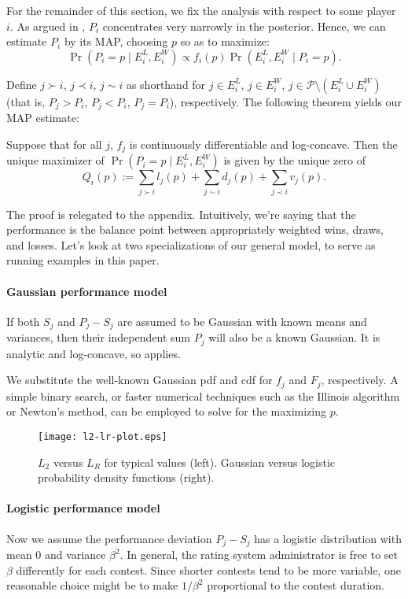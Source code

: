 For the remainder of this section, we fix the analysis with respect to some player $i$. As argued in , $P_i$ concentrates very narrowly in the posterior. Hence, we can estimate $P_i$ by its MAP, choosing $p$ so as to maximize:
\[\Pr(P_i=p\mid E^L_i,E^W_i) \propto f_i(p) \Pr(E^L_i,E^W_i\mid P_i=p).\]

Define $j\succ i$, $j\prec i$, $j\sim i$ as shorthand for $j\in E^L_i$, $j\in E^W_i$, $j\in \mathcal P\setminus (E^L_i\cup E^W_i)$ (that is, $P_j>P_i$, $P_j<P_i$, $P_j=P_i$), respectively. The following theorem yields our MAP estimate:
\begin{theorem}
\label{thm:uniq-max}
Suppose that for all $j$, $f_j$ is continuously differentiable and log-concave. Then the unique maximizer of $\Pr(P_i=p\mid E^L_i,E^W_i)$ is given by the unique zero of
\[Q_i(p) := \sum_{j \succ i} l_j(p) + \sum_{j \sim i} d_j(p) + \sum_{j \prec i} v_j(p).\]
\end{theorem}
The proof is relegated to the appendix. Intuitively, we're saying that the performance is the balance point between appropriately weighted wins, draws, and losses. Let's look at two specializations of our general model, to serve as running examples in this paper.

\paragraph{Gaussian performance model}
If both $S_j$ and $P_j-S_j$ are assumed to be Gaussian with known means and variances, then their independent sum $P_j$ will also be a known Gaussian. It is analytic and log-concave, so  applies.

We substitute the well-known Gaussian pdf and cdf for $f_j$ and $F_j$, respectively. A simple binary search, or faster numerical techniques such as the Illinois algorithm or Newton's method, can be employed to solve for the maximizing $p$.

\begin{figure}
    \centering
    \texttt{[image: l2-lr-plot.eps]}
    \caption{$L_2$ versus $L_R$ for typical values (left). Gaussian versus logistic probability density functions (right).}
    \label{fig:l2-lr-plot}
\end{figure}

\paragraph{Logistic performance model}
Now we assume the performance deviation $P_j-S_j$ has a logistic distribution with mean 0 and variance $\beta^2$. In general, the rating system administrator is free to set $\beta$ differently for each contest. Since shorter contests tend to be more variable, one reasonable choice might be to make $1/\beta^2$ proportional to the contest duration.


